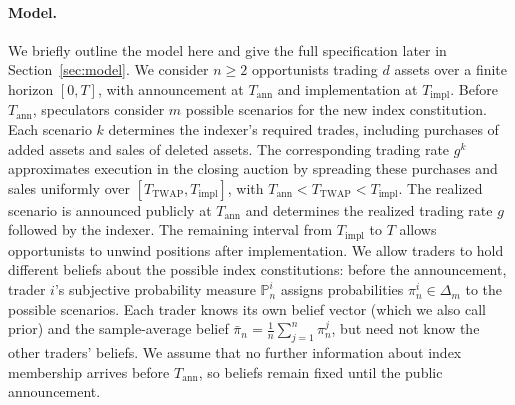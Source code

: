 \documentclass[12pt]{article}
\numberwithin{equation}{section}
\theoremstyle{definition}
\begin{document}
\paragraph{Model.}
We briefly outline the model here and give the full specification later in
Section~\ref{sec:model}.
We consider \(n\geq2\) opportunists trading \(d\) assets over a finite
horizon \([0,T]\), with announcement at \(T_{\mathrm{ann}}\) and
implementation at \(T_{\mathrm{impl}}\). Before \(T_{\mathrm{ann}}\),
speculators consider \(m\) possible scenarios for the new index constitution.
Each scenario \(k\) determines the indexer's required trades, including
purchases of added assets and sales of deleted assets. The corresponding
trading rate \(g^k\) approximates execution in the closing auction by
spreading these purchases and sales uniformly over
\([T_{\mathrm{TWAP}},T_{\mathrm{impl}}]\), with
\(T_{\mathrm{ann}}<T_{\mathrm{TWAP}}<T_{\mathrm{impl}}\).
The realized scenario is announced publicly at \(T_{\mathrm{ann}}\) and determines the realized
trading rate \(g\) followed by the indexer.
The remaining interval from \(T_{\mathrm{impl}}\) to \(T\) allows opportunists to unwind
positions after implementation.
We allow traders to hold different beliefs about the possible index
constitutions: before the announcement, trader \(i\)'s subjective probability
measure \(\mathbb P_n^i\) assigns probabilities \(\pi_n^i\in\Delta_m\)
to the possible scenarios.
Each trader knows its own belief vector (which we also call prior) and the sample-average belief
\(\bar\pi_n=\frac1n\sum_{j=1}^n\pi_n^j\),
but need not know the other traders' beliefs. We assume that no further
information about index membership arrives before \(T_{\mathrm{ann}}\), so
beliefs remain fixed until the public announcement.
\end{document}
